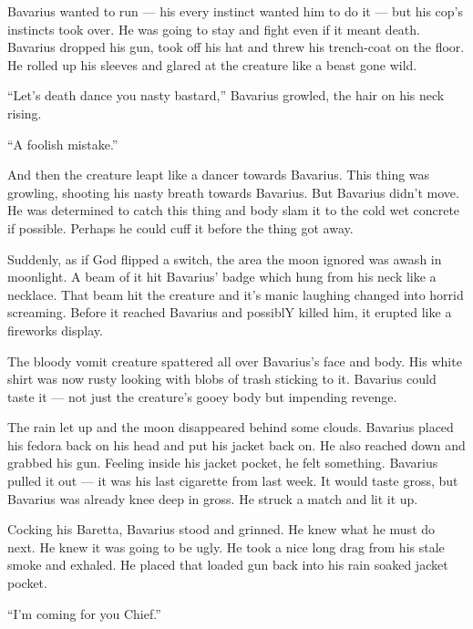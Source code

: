 Bavarius wanted to run --- his every instinct wanted him to do
it --- but his cop's instincts took over. He was going to stay
and fight even if it meant death. Bavarius dropped his gun, took
off his hat and threw his trench-coat on the floor. He rolled up
his sleeves and glared at the creature like a beast gone
wild.



``Let's death dance you nasty bastard,'' Bavarius
growled, the hair on his neck rising.



``A foolish mistake.''



And then the creature leapt like a dancer towards Bavarius. This
thing was growling, shooting his nasty breath towards Bavarius. But
Bavarius didn't move. He was determined to catch this thing and
body slam it to the cold wet concrete if possible. Perhaps he could
cuff it before the thing got away.



Suddenly, as if God flipped a switch, the area the moon ignored was
awash in moonlight. A beam of it hit Bavarius' badge which hung
from his neck like a necklace. That beam hit the creature and it's
manic laughing changed into horrid screaming. Before it reached
Bavarius and possiblY killed him, it erupted like a fireworks
display.



The bloody vomit creature spattered all over Bavarius's face and
body. His white shirt was now rusty looking with blobs of trash
sticking to it. Bavarius could taste it --- not just the
creature's gooey body but impending revenge.



The rain let up and the moon disappeared behind some clouds.
Bavarius placed his fedora back on his head and put his jacket back
on. He also reached down and grabbed his gun. Feeling inside his
jacket pocket, he felt something. Bavarius pulled it out --- it
was his last cigarette from last week. It would taste gross, but
Bavarius was already knee deep in gross. He struck a match and lit
it up.



Cocking his Baretta, Bavarius stood and grinned. He knew what he
must do next. He knew it was going to be ugly. He took a nice long
drag from his stale smoke and exhaled. He placed that loaded gun
back into his rain soaked jacket pocket.



``I'm coming for you Chief.'' 

 




